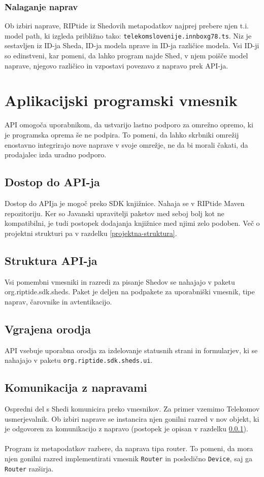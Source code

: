 \documentclass[12pt]{article}
\begin{document}
\subsubsection{Nalaganje naprav} \label{nalaganje-naprav}
Ob izbiri naprave, RIPtide iz Shedovih metapodatkov najprej prebere
njen t.i. model path, ki izgleda približno
tako: \verb|telekomslovenije.innboxg78.ts|. Niz je sestavljen iz ID-ja
Sheda, ID-ja modela nprave in ID-ja različice modela. Vsi ID-ji so
edinstveni, kar pomeni, da lahko program najde Shed, v njem poišče model
naprave, njegovo različico in vzpostavi povezavo z napravo prek API-ja.
\newpage

\section{Aplikacijski programski vmesnik}
API omogoča uporabnikom, da ustvarijo lastno podporo za omrežno
opremo, ki je programska oprema še ne podpira. To pomeni, da lahko
skrbniki omrežij enostavno integrirajo nove naprave v svoje omrežje, ne da
bi morali čakati, da prodajalec izda uradno podporo.

\subsection{Dostop do API-ja}
Dostop do APIja je mogoč preko SDK knjižnice. Nahaja se v RIPtide
Maven repozitoriju. Ker so Javanski upravitelji paketov med seboj bolj
kot ne kompatibilni, je tudi postopek dodajanja knjižnice med njimi
zelo podoben. Več o projektni strukturi pa v razdelku
\ref{projektna-struktura}.

\subsection{Struktura API-ja}
Vsi pomembni vmesniki in razredi za pisanje Shedov se
nahajajo v paketu org.riptide.sdk.sheds. Paket je deljen na
podpakete za uporabniški vmesnik, tipe naprav, čarovnike in
avtentikacijo.

\subsection{Vgrajena orodja}
API vsebuje uporabna orodja za izdelovanje statusnih strani in
formularjev, ki se nahajajo v paketu \verb|org.riptide.sdk.sheds.ui|.

\subsection{Komunikacija z napravami} \label{komunikacija-z-napravami}
Ospredni del s Shedi komunicira preko vmesnikov. Za primer vzemimo
Telekomov usmerjevalnik. Ob izbiri naprave se instancira njen gonilni
razred v nov objekt, ki je odgovoren za komunikacijo z napravo
(postopek je opisan v razdelku \ref{nalaganje-naprav}).
\\\\
Program iz metapodatkov razbere, da naprava tipa router. To pomeni,
da mora njen gonilni razred implementirati vmesnik \verb|Router| in
posledično \verb|Device|, saj ga \verb|Router| razširja.
\newpage
\end{document}

